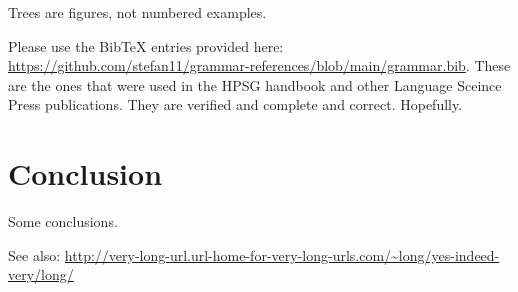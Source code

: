\documentclass[11pt,a4paper,fleqn,draft]{article}
\begin{document}
Trees are figures, not numbered examples.

Please use the BibTeX entries provided here:
\url{https://github.com/stefan11/grammar-references/blob/main/grammar.bib}. These are the ones that
were used in the HPSG handbook and other Language Sceince Press publications. They are verified and
complete and correct. Hopefully.

\section{Conclusion}

Some conclusions.


See also: \url{http://very-long-url.url-home-for-very-long-urls.com/~long/yes-indeed-very/long/}





{\sloppy
\printbibliography[heading=subbibliography,notkeyword=this] 
}
\end{document}
